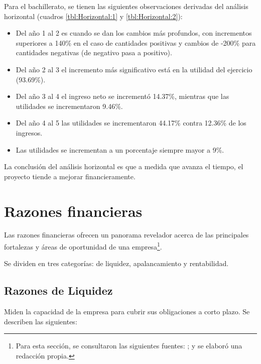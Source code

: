 Para el bachillerato, se tienen las siguientes observaciones derivadas del análisis horizontal (cuadros \ref{tbl:Horizontal:1} y \ref{tbl:Horizontal:2}):

\begin{itemize}
	\item Del año 1 al 2 es cuando se dan los cambios más profundos, con incrementos superiores a 140\% en el caso de cantidades positivas y cambios de -200\% para cantidades negativas (de negativo pasa a positivo).
	\item Del año 2 al 3 el incremento más significativo está en la utilidad del ejercicio (93.69\%).
	\item Del año 3 al 4 el ingreso neto se incrementó 14.37\%, mientras que las utilidades se incrementaron 9.46\%.
	\item Del año 4 al 5 las utilidades se incrementaron 44.17\% contra 12.36\% de los ingresos.
	\item Las utilidades se incrementan a un porcentaje siempre mayor a 9\%.
\end{itemize}

La conclusión del análisis horizontal es que a medida que avanza el tiempo, el proyecto tiende a mejorar financieramente.





\clearpage
\section{Razones financieras}

Las razones financieras ofrecen un panorama revelador acerca de las principales fortalezas y áreas de oportunidad de una empresa\footnote{Para esta sección, se consultaron las siguientes fuentes: \citep{Brigham2005fundamentos, Gitman2003principios, Horngren2000introduccion, Moyer2004administracion, Van2003fundamentos}; y se elaboró una redacción propia.}.

Se dividen en tres categorías: de liquidez, apalancamiento y rentabilidad.



\subsection{Razones de Liquidez}

Miden la capacidad de la empresa para cubrir sus obligaciones a corto plazo. Se describen las siguientes:

